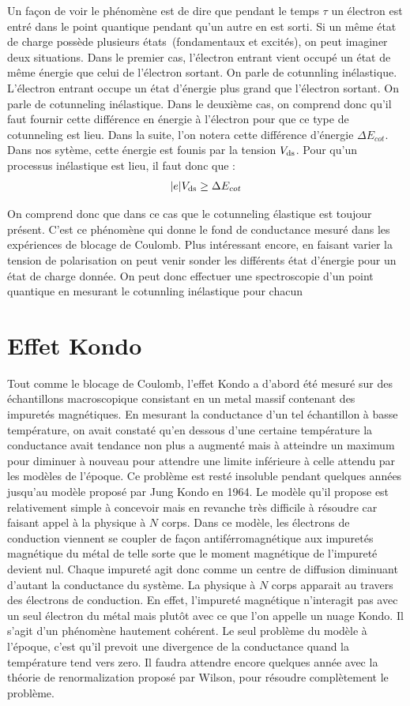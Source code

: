 Un façon de voir le phénomène est de dire que pendant le temps $\tau$ un électron est entré dans le point quantique pendant qu'un autre en est sorti. Si un m\^eme état de charge possède plusieurs états~(fondamentaux et excités), on peut imaginer deux situations. Dans le premier cas, l'électron entrant vient occupé un état de m\^eme énergie que celui de l'électron sortant. On parle de cotunnling inélastique. L'électron entrant occupe un état d'énergie plus grand que l'électron sortant. On parle de cotunneling inélastique. Dans le deuxième cas, on comprend donc qu'il faut fournir cette différence en énergie à l'électron pour que ce type de cotunneling est lieu. Dans la suite, l'on notera cette différence d'énergie $\Delta E_{cot}$. Dans nos sytème, cette énergie est founis par la tension $V_{\rm{ds}}$. Pour qu'un processus inélastique est lieu, il faut donc que :
\begin{eqnarray}
|e|V_{\rm{ds}} \geq \Delta E_{cot}
\end{eqnarray}

On comprend donc que dans ce cas que le cotunneling élastique est toujour présent. C'est ce phénomène qui donne le fond de conductance mesuré dans les expériences de blocage de Coulomb. Plus intéressant encore, en faisant varier la tension de polarisation on peut venir sonder les différents état d'énergie pour un état de charge donnée. On peut donc effectuer une spectroscopie d'un point quantique en mesurant le cotunnling inélastique pour chacun

\section{Effet Kondo}

Tout comme le blocage de Coulomb, l'effet Kondo a d'abord été mesuré sur des échantillons macroscopique consistant en un metal massif contenant des impuretés magnétiques. En mesurant la conductance d'un tel échantillon à basse température, on avait constaté  qu'en dessous d'une certaine température la conductance avait tendance non plus a augmenté mais à atteindre un maximum pour diminuer à nouveau pour attendre une limite inférieure à celle attendu par les modèles de l'époque. Ce problème est resté insoluble pendant quelques années jusqu'au modèle proposé par Jung Kondo en 1964. Le modèle qu'il propose est relativement simple à concevoir mais en revanche très difficile à résoudre car faisant appel à la physique à $N$ corps. Dans ce modèle, les électrons de conduction viennent se coupler de façon antiférromagnétique aux impuretés magnétique du métal de telle sorte que le moment magnétique de l'impureté devient nul. Chaque impureté agit donc comme un centre de diffusion diminuant d'autant la conductance du système. La physique à $N$ corps apparait au travers des électrons de conduction. En effet, l'impureté magnétique n'interagit pas avec un seul électron du métal mais plutôt avec ce que l'on appelle un nuage Kondo. Il s'agit d'un phénomène hautement cohérent. Le seul problème du modèle à l'époque, c'est qu'il prevoit une divergence de la conductance quand la température tend vers zero. Il faudra attendre encore quelques année avec la théorie de renormalization proposé par Wilson, pour résoudre complètement le problème.

